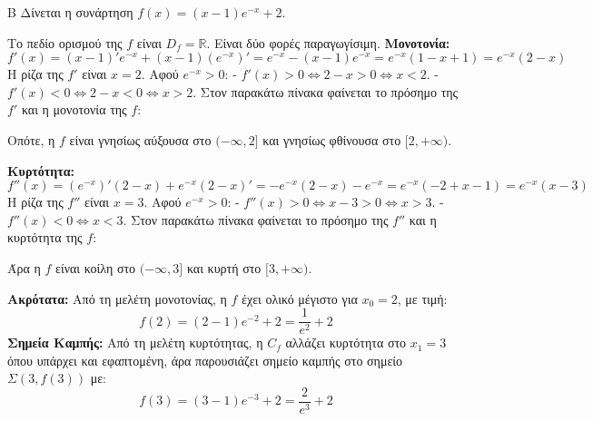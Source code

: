\begin{thema}{Β}
Δίνεται η συνάρτηση $f(x) = (x-1)e^{-x} + 2$.

\begin{erwthma}
\item Το πεδίο ορισμού της $f$ είναι $D_f = \mathbb{R}$. Είναι δύο φορές παραγωγίσιμη.
\textbf{Μονοτονία:}
\[ f'(x) = (x-1)'e^{-x} + (x-1)(e^{-x})' = e^{-x} - (x-1)e^{-x} = e^{-x}(1 - x + 1) = e^{-x}(2-x) \]
Η ρίζα της $f'$ είναι $x = 2$. Αφού $e^{-x} > 0$:
- $f'(x) > 0 \Leftrightarrow 2-x > 0 \Leftrightarrow x < 2$.
- $f'(x) < 0 \Leftrightarrow 2-x < 0 \Leftrightarrow x > 2$.
Στον παρακάτω πίνακα φαίνεται το πρόσημο της $f'$ και η μονοτονία της $f$:
\begin{center}
\end{center}
Οπότε, η $f$ είναι γνησίως αύξουσα στο $(-\infty, 2]$ και γνησίως φθίνουσα στο $[2, +\infty)$.

\textbf{Κυρτότητα:}
\[ f''(x) = (e^{-x})'(2-x) + e^{-x}(2-x)' = -e^{-x}(2-x) - e^{-x} = e^{-x}(-2+x-1) = e^{-x}(x-3) \]
Η ρίζα της $f''$ είναι $x = 3$. Αφού $e^{-x} > 0$:
- $f''(x) > 0 \Leftrightarrow x-3 > 0 \Leftrightarrow x > 3$.
- $f''(x) < 0 \Leftrightarrow x < 3$.
Στον παρακάτω πίνακα φαίνεται το πρόσημο της $f''$ και η κυρτότητα της $f$:
\begin{center}
\end{center}
Άρα η $f$ είναι κοίλη στο $(-\infty, 3]$ και κυρτή στο $[3, +\infty)$.

\item \textbf{Ακρότατα:} Από τη μελέτη μονοτονίας, η $f$ έχει ολικό μέγιστο για $x_0=2$, με τιμή:
\[ f(2) = (2-1)e^{-2} + 2 = \frac{1}{e^2} + 2 \]
\textbf{Σημεία Καμπής:} Από τη μελέτη κυρτότητας, η $C_f$ αλλάζει κυρτότητα στο $x_1=3$ όπου υπάρχει και εφαπτομένη, άρα παρουσιάζει σημείο καμπής στο σημείο $\Sigma(3, f(3))$ με:
\[ f(3) = (3-1)e^{-3} + 2 = \frac{2}{e^3} + 2 \]


\end{erwthma}
\end{thema}
